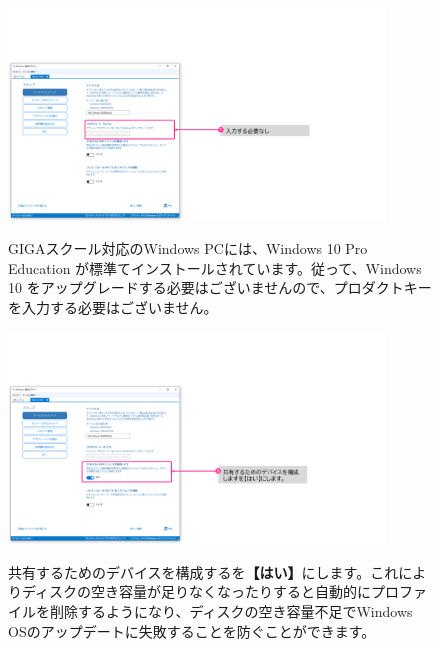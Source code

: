 \begin{figure}[hp]
    \begin{minipage}{0.6\textwidth}
        \vspace{-1cm}
        \includegraphics[width=10cm]{figures/MakeProvisioningPackage-06}
    \end{minipage}
    \begin{minipage}{0.4\textwidth}
        GIGAスクール対応のWindows PCには、Windows 10 Pro Education が標準てインストールされています。従って、Windows 10 をアップグレードする必要はございませんので、プロダクトキーを入力する必要はございません。
    \end{minipage}
\end{figure}

\begin{figure}[hp]
    \begin{minipage}{0.6\textwidth}
        \vspace{-1cm}
        \includegraphics[width=10cm]{figures/MakeProvisioningPackage-07}
    \end{minipage}
    \begin{minipage}{0.4\textwidth}
        共有するためのデバイスを構成するを\textbf{【はい】}にします。これによりディスクの空き容量が足りなくなったりすると自動的にプロファイルを削除するようになり、ディスクの空き容量不足でWindows OSのアップデートに失敗することを防ぐことができます。
    \end{minipage}
\end{figure}

